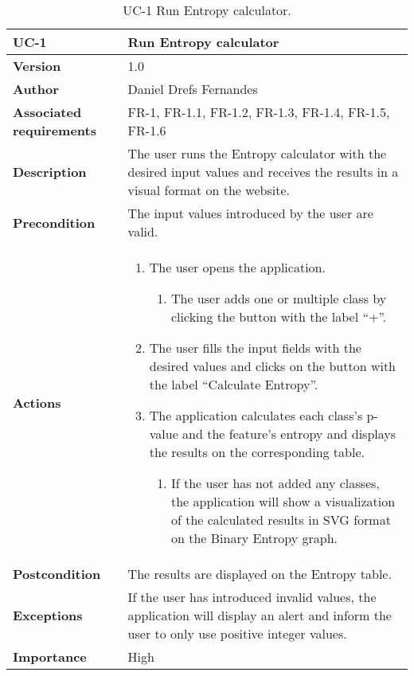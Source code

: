 \begin{table}[p]
	\centering
	\begin{tabularx}{\linewidth}{ p{} p{} }
		\toprule
		\textbf{UC-1}    & \textbf{Run Entropy calculator}\\
		\toprule
		\textbf{Version}              & 1.0    \\
		\textbf{Author}                & Daniel Drefs Fernandes \\
		\textbf{Associated requirements} & FR-1, FR-1.1, FR-1.2, FR-1.3, FR-1.4, FR-1.5, FR-1.6 \\
		\textbf{Description}          & The user runs the Entropy calculator with the desired input values and receives the results in a visual format on the website. \\
		\textbf{Precondition}         & The input values introduced by the user are valid. \\
		\textbf{Actions}             &
		\begin{enumerate}
			\def\labelenumi{\arabic{enumi}.}
			\tightlist
			\item The user opens the application.
            \begin{enumerate}
                \item The user adds one or multiple class by clicking the button with the label ``+''.
            \end{enumerate}
			\item The user fills the input fields with the desired values and clicks on the button with the label ``Calculate Entropy''.
            \item The application calculates each class's p-value and the feature's entropy and displays the results on the corresponding table.
            \begin{enumerate}
                \item If the user has not added any classes, the application will show a visualization of the calculated results in SVG format on the Binary Entropy graph.
            \end{enumerate}
		\end{enumerate}\\
		\textbf{Postcondition}        & The results are displayed on the Entropy table. \\
		\textbf{Exceptions}          & If the user has introduced invalid values, the application will display an alert and inform the user to only use positive integer values. \\
		\textbf{Importance}          & High \\
		\bottomrule
	\end{tabularx}
	\caption{UC-1 Run Entropy calculator.}
    \label{table:uc_1}
\end{table}

